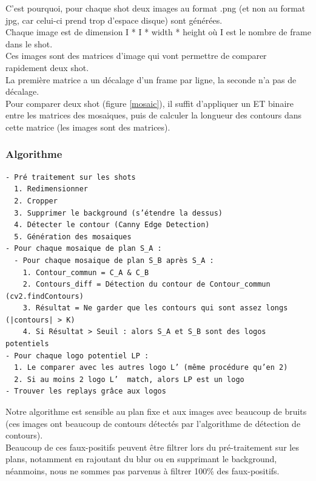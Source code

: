 \documentclass[11pt]{article}
\begin{document}
C'est pourquoi, pour chaque shot deux images au format .png (et non au format jpg, car celui-ci prend trop d'espace disque) sont générées.\\

Chaque image est de dimension I * I * width * height où I est le nombre de frame dans le shot.\\

Ces images sont des matrices d'image qui vont permettre de comparer rapidement deux shot.\\
La première matrice a un décalage d'un frame par ligne, la seconde n'a pas de décalage.\\

Pour comparer deux shot (figure \ref{mosaic}), il suffit d’appliquer un ET binaire entre les matrices des mosaiques, puis de calculer la longueur des contours dans cette matrice (les images sont des matrices).\\

\subsubsection{Algorithme}
\label{sec:orgbead427}
\begin{verbatim}
- Pré traitement sur les shots
  1. Redimensionner
  2. Cropper
  3. Supprimer le background (s’étendre la dessus)
  4. Détecter le contour (Canny Edge Detection)
  5. Génération des mosaiques
- Pour chaque mosaique de plan S_A :
  - Pour chaque mosaique de plan S_B après S_A :
    1. Contour_commun = C_A & C_B
    2. Contours_diff = Détection du contour de Contour_commun (cv2.findContours)
    3. Résultat = Ne garder que les contours qui sont assez longs (|contours| > K)
    4. Si Résultat > Seuil : alors S_A et S_B sont des logos potentiels
- Pour chaque logo potentiel LP :
  1. Le comparer avec les autres logo L’ (même procédure qu’en 2)
  2. Si au moins 2 logo L’  match, alors LP est un logo
- Trouver les replays grâce aux logos
\end{verbatim}

Notre algorithme est sensible au plan fixe et aux images avec beaucoup de bruits (ces images ont beaucoup de contours détectés par l’algorithme de détection de contours).\\
Beaucoup de ces faux-positifs peuvent être filtrer lors du pré-traitement sur les plans, notamment en rajoutant du blur ou en supprimant le background, néanmoins, nous ne sommes pas parvenus à filtrer 100\% des faux-positifs.\\
\end{document}
